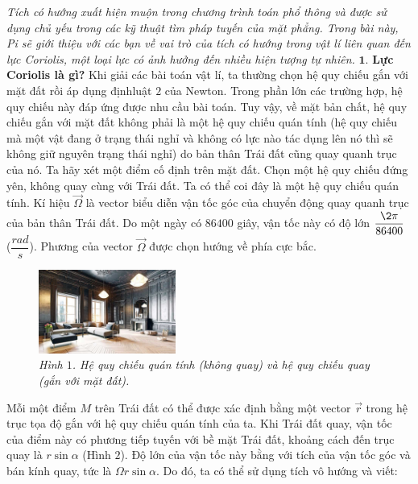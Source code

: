 \begin{multicols}{2}
	\textit{Tích có hướng xuất hiện muộn trong chương trình toán phổ thông và được sử dụng chủ yếu trong các kỹ thuật tìm pháp tuyến của mặt phẳng. Trong bài này, Pi sẽ giới thiệu với các bạn về vai trò của tích có hướng trong vật lí liên quan đến lực Coriolis, một loại lực có ảnh hưởng đến nhiều hiện tượng tự nhiên.}
	\vskip 0.1cm
	$\pmb{1.}$ \textbf{Lực Coriolis là gì?}
	\vskip 0.1cm
	Khi giải các bài toán vật lí, ta thường chọn hệ quy chiếu gắn với mặt đất rồi áp dụng định\linebreak luật $2$ của Newton. Trong phần lớn các trường hợp, hệ quy chiếu này đáp ứng được nhu cầu bài toán. Tuy vậy, về mặt bản chất, hệ quy chiếu gắn với mặt đất không phải là một hệ quy chiếu quán tính (hệ quy chiếu mà một vật đang ở trạng thái nghỉ và không có lực nào tác dụng lên nó thì sẽ không giữ nguyên trạng thái nghỉ) do bản thân Trái đất cũng quay quanh trục của nó.
	\vskip 0.1cm
	Ta hãy xét một điểm cố định trên mặt đất. Chọn một hệ quy chiếu đứng yên, không quay cùng với Trái đất. Ta có thể coi đây là một hệ quy chiếu quán tính. 
	\vskip 0.1cm
	Kí hiệu $\overrightarrow{\Omega}$ là vector biểu diễn vận tốc góc của chuyển động quay quanh trục của bản thân Trái đất. Do một ngày có $86400$ giây, vận tốc này có độ lớn $\dfrac{\2\pi}{86400}$ ($\dfrac{rad}{s}$). Phương của vector $\overrightarrow{\Omega}$ được chọn hướng về phía cực bắc.
		\begin{figure}[H]
		\vspace*{-10pt}
		\centering
		\captionsetup{labelformat= empty, justification=centering}
		\includegraphics[width= 0.4\textwidth]{11}
		\caption{\small\textit{\color{timhieukhoahoc}Hình $1$. Hệ quy chiếu quán tính (không quay) và hệ quy chiếu quay (gắn với mặt đất).}}
		\vspace*{-10pt}
	\end{figure}
	Mỗi một điểm $M$ trên Trái đất có thể được xác định bằng một vector $\overrightarrow{r}$ trong hệ trục tọa độ gắn với hệ quy chiếu quán tính của ta. Khi Trái đất quay, vận tốc của điểm này có phương tiếp tuyến với bề mặt Trái đất, khoảng cách đến trục quay là $r\sin\alpha$ (Hình $2$). Độ lớn của vận tốc này bằng với tích của vận tốc góc và bán kính quay, tức là $\Omega r \sin\alpha$. Do đó, ta có thể sử dụng tích vô hướng và viết:

\end{multicols}

